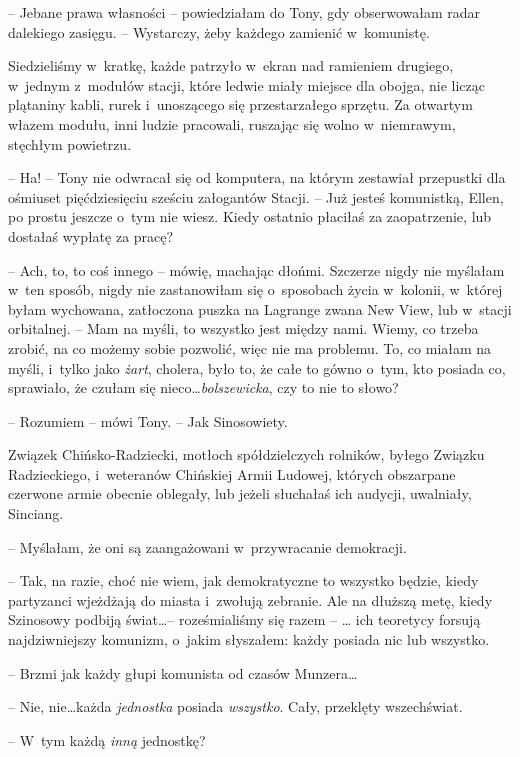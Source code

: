 \documentclass[oneside,polish,11pt,sfheadings]{mwbk}
\begin{document}
-- Jebane prawa własności -- powiedziałam do Tony, gdy obserwowałam radar
dalekiego zasięgu. -- Wystarczy, żeby każdego zamienić w~komunistę.

Siedzieliśmy w~kratkę, każde patrzyło w~ekran nad ramieniem drugiego, w~jednym z~modułów stacji, które ledwie miały miejsce dla obojga, nie
licząc plątaniny kabli, rurek i~unoszącego się przestarzałego sprzętu.
Za otwartym włazem modułu, inni ludzie pracowali, ruszając się wolno w~niemrawym, stęchłym powietrzu.

-- Ha! -- Tony nie odwracał się od komputera, na którym zestawiał
przepustki dla ośmiuset pięćdziesięciu sześciu załogantów Stacji. -- Już
jesteś komunistką, Ellen, po prostu jeszcze o~tym nie wiesz. Kiedy
ostatnio płaciłaś za zaopatrzenie, lub dostałaś wypłatę za pracę?

-- Ach, to, to coś innego -- mówię, machając dłońmi. Szczerze nigdy nie
myślałam w~ten sposób, nigdy nie zastanowiłam się o~sposobach życia w~kolonii, w~której byłam wychowana, zatłoczona puszka na Lagrange zwana
New View, lub w~stacji orbitalnej. -- Mam na myśli, to wszystko jest
między nami. Wiemy, co trzeba zrobić, na co możemy sobie pozwolić, więc
nie ma problemu. To, co miałam na myśli, i~tylko jako \textit{żart},
cholera, było to, że całe to gówno o~tym, kto posiada co, sprawiało, że
czułam się nieco\ldots  \textit{bolszewicka}, czy to nie to słowo?

-- Rozumiem -- mówi Tony. -- Jak Sinosowiety.

Związek Chińsko-Radziecki, motłoch spółdzielczych rolników, byłego
Związku Radzieckiego, i~weteranów Chińskiej Armii Ludowej, których
obszarpane czerwone armie obecnie oblegały, lub jeżeli słuchałaś ich
audycji, uwalniały, Sinciang.

-- Myślałam, że oni są zaangażowani w~przywracanie demokracji.

-- Tak, na razie, choć nie wiem, jak demokratyczne to wszystko będzie,
kiedy partyzanci wjeżdżają do miasta i~zwołują zebranie. Ale na dłuższą
metę, kiedy Szinosowy podbiją świat\ldots  -- roześmialiśmy się razem -- \ldots 
ich teoretycy forsują najdziwniejszy komunizm, o~jakim słyszałem: każdy
posiada nic lub wszystko.

-- Brzmi jak każdy głupi komunista od czasów Munzera\ldots 

-- Nie, nie\ldots  każda \textit{jednostka} posiada \textit{wszystko}. Cały,
przeklęty wszechświat.

-- W~tym każdą \textit{inną} jednostkę?
\end{document}
